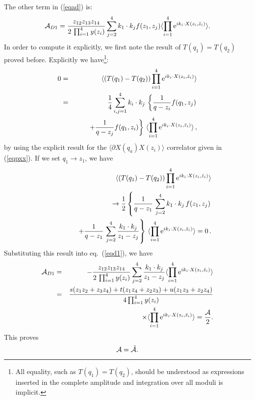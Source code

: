 \documentclass[a4paper,12pt]{article}
\begin{document}
The other term in (\ref{eqad}) is:
\begin{equation}
 {\cal A}_{D1}  =  {z_{12}z_{13}z_{14} \over 2\,
 \prod_{i=1}^4 y(z_i)}
  \sum_{ j=2}^4 k_1 \cdot k_j
 f(z_1,z_j)   \langle \prod_{i=1}^4
\hbox{e}^{i k_i \cdot X(z_i, \bar z_i)} \rangle  . \label{eqd1}
\end{equation}
In order to compute it explicitly, we first note the result of
$T(q_1) = T(q_2)$ proved before. Explicitly we have\footnote{All
equality, such as $T(q_1) = T(q_2)$,  should be understood as
expressions inserted in the complete amplitude and integration
over all moduli is implicit.}:
\begin{eqnarray}
0 & = & \langle (T(q_1) - T(q_2)) \prod_{i=1}^4 \hbox{e}^{i k_i
\cdot
X(z_i, \bar z_i)} \rangle \nonumber \\
& =  &    {1\over 4} \sum_{i,j=1}^4 k_i \cdot k_j \, \left\{ { 1
\over q-z_i} f(q_1,z_j) \right. \nonumber \\
& & \qquad  \left. +  { 1 \over q-z_j} f(q_1,z_i) \right\} \,
\langle \prod_{i=1}^4 \hbox{e}^{i k_i \cdot X(z_i, \bar z_i)}
\rangle \, ,
\end{eqnarray}
by using the explicit result for the $\langle \partial X(q_a)
X(z_i)\rangle$ correlator given in (\ref{eqpxx}). If we set $q_1
\to z_1$, we have
\begin{eqnarray}
& & \langle (T(q_1) - T(q_2))  \prod_{i=1}^4 \hbox{e}^{i k_i \cdot
X(z_i, \bar z_i)} \rangle \nonumber \\
& & \qquad \to {1\over 2} \left\{   {1\over q - z_1} \,
\sum_{j=2}^4 k_1 \cdot k_j \, f(z_1,z_j) \right. \nonumber \\
& & \qquad \qquad  \left. +
 {1\over q - z_1} \, \sum_{j=2}^4
  { k_1\cdot k_j\over z_1 - z_j} \right\}
 \, \langle \prod_{i=1}^4 \hbox{e}^{i k_i
\cdot X(z_i, \bar z_i)} \rangle =0  \, . \label{diff}
\end{eqnarray}
Substituting this result into eq.~(\ref{eqd1}), we have
\begin{eqnarray}
{\cal A}_{D1} & = & - {z_{12}z_{13}z_{14} \over 2\,
 \prod_{i=1}^4 y(z_i)}
  \sum_{ j=2}^4 {k_1 \cdot k_j \over z_1 - z_j}
 \langle \prod_{i=1}^4
 \hbox{e}^{i k_i \cdot X(z_i, \bar z_i)} \rangle \nonumber \\
 & = &  { s (z_1z_2 + z_3 z_4) + t (z_1z_4 + z_2 z_3 ) + u (z_1
z_3 + z_2 z_4) \over 4 \prod_{i=1}^4  y(z_i)} \nonumber \\
& & \times \langle \prod_{i=1}^4 \hbox{e}^{i k_i \cdot X(z_i, \bar
z_i)} \rangle = { {\cal A} \over  2 } .
\end{eqnarray}
This proves
\begin{equation}
{\cal A} = \tilde{\cal A}.
\end{equation}
\end{document}
